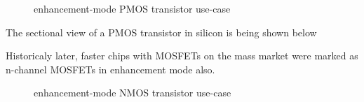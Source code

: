 \documentclass[10pt,a4paper,oneside]{article}
\begin{document}
\begin{center}
	\begin{figure}[h]
		\begin{center}
			\begin{circuitdiagram}[draft*]{20}{20}
			\end{circuitdiagram}
		\end{center}
		\caption{enhancement-mode PMOS transistor use-case}
	\end{figure}
\end{center}

The sectional view of a PMOS transistor in silicon is being shown below
\begin{center}
\end{center}

Historicaly later, faster chips with MOSFETs on the mass market were marked as n-channel MOSFETs in enhancement mode also.

\begin{center}
	\begin{figure}[h]
		\begin{center}
			\begin{circuitdiagram}[draft*]{20}{20}
			\end{circuitdiagram}
		\end{center}
		\caption{enhancement-mode NMOS transistor use-case}
	\end{figure}
\end{center}
\end{document}
